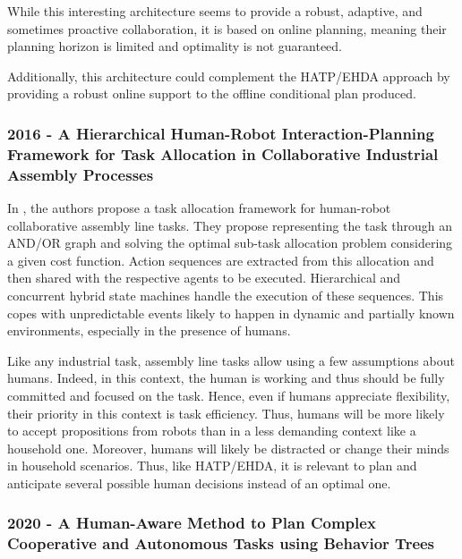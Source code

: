 While this interesting architecture seems to provide a robust, adaptive, and sometimes proactive collaboration, it is based on online planning, meaning their planning horizon is limited and optimality is not guaranteed. 

Additionally, this architecture could complement the HATP/EHDA approach by providing a robust online support to the offline conditional plan produced. 


\subsubsection{2016 - A Hierarchical Human-Robot Interaction-Planning Framework for Task Allocation in Collaborative Industrial Assembly Processes}
\label{w7}

In \cite{johannsmeier2016hierarchical}, the authors propose a task allocation framework for human-robot collaborative assembly line tasks. They propose representing the task through an AND/OR graph and solving the optimal sub-task allocation problem considering a given cost function. Action sequences are extracted from this allocation and then shared with the respective agents to be executed. Hierarchical and concurrent hybrid state machines handle the execution of these sequences. This copes with unpredictable events likely to happen in dynamic and partially known environments, especially in the presence of humans.  

Like any industrial task, assembly line tasks allow using a few assumptions about humans. Indeed, in this context, the human is working and thus should be fully committed and focused on the task. Hence, even if humans appreciate flexibility, their priority in this context is task efficiency. Thus, humans will be more likely to accept propositions from robots than in a less demanding context like a household one. Moreover, humans will likely be distracted or change their minds in household scenarios. Thus, like HATP/EHDA, it is relevant to plan and anticipate several possible human decisions instead of an optimal one.


\subsubsection{2020 - A Human-Aware Method to Plan Complex Cooperative and Autonomous Tasks using Behavior Trees}
\label{w10}




